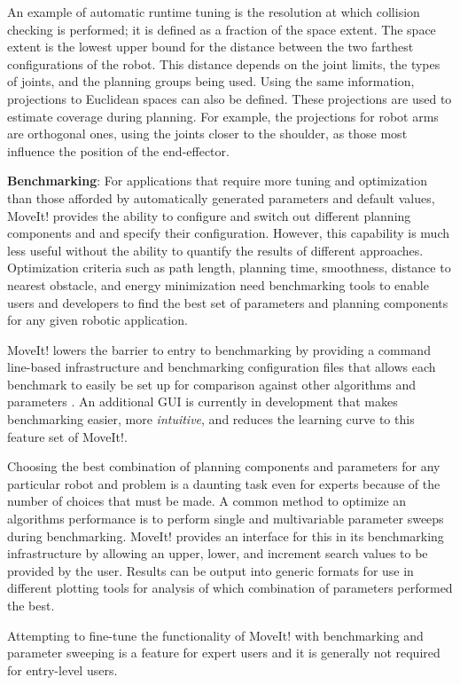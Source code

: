 \documentclass[10pt,journal,compsoc]{joser1}
\begin{document}
{An example of automatic runtime tuning is the resolution at which collision
checking is performed; it is defined as a fraction of the space extent. The
space extent is the lowest upper bound for the distance between the two farthest
configurations of the robot. This distance depends on the joint limits, the
types of joints, and the planning groups being used. Using the same information,
projections to Euclidean spaces can also be defined. These projections are used
to estimate coverage during planning. For example, the projections for robot
arms are orthogonal ones, using the joints closer to the shoulder, as those most
influence the position of the end-effector.

{\bf Benchmarking}: For applications that require more tuning and optimization than those afforded by automatically generated parameters and default values, MoveIt! provides the ability to configure and switch out different planning
components and and specify their configuration. However, this capability is much less useful
without the ability to quantify the results of different approaches.
Optimization criteria such as path length, planning time, smoothness, distance
to nearest obstacle, and energy minimization need benchmarking tools to enable
users and developers to find the best set of parameters and planning components
for any given robotic application.

MoveIt! lowers the barrier to entry to benchmarking by providing a command
line-based infrastructure and benchmarking configuration files that allows each
benchmark to easily be set up for comparison against other algorithms and
parameters \cite{cohen2012generic}. An additional GUI is currently in
development that makes benchmarking easier, more \textit{intuitive}, and reduces
the learning curve to this feature set of MoveIt!.

Choosing the best combination of planning components and parameters for any
particular robot and problem is a daunting task even for experts because of the
number of choices that must be made\cite{cohen2012generic}. A common method to
optimize an algorithms performance is to perform single and multivariable
parameter sweeps during benchmarking. MoveIt! provides an interface for this in
its benchmarking infrastructure by allowing an upper, lower, and increment
search values to be provided by the user. Results can be output into generic
formats for use in different plotting tools for analysis of which combination of
parameters performed the best.

Attempting to fine-tune the functionality of MoveIt! with benchmarking and parameter sweeping is a feature for expert users and it is generally not required for entry-level users.

}
\end{document}
